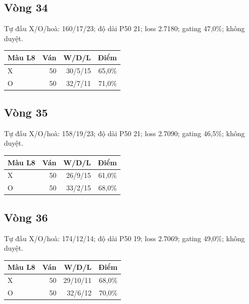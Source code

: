 \subsection*{Vòng 34}

Tự đấu X/O/hoà: 160/17/23; độ dài P50 21; loss 2.7180; gating 47,0\%; không duyệt.

\begin{center}\scriptsize\begin{tabular}{@{}lrrr@{}}\toprule

Màu L8 & Ván & W/D/L & Điểm \\

\midrule

X & 50 & 30/5/15 & 65,0\% \\

O & 50 & 32/7/11 & 71,0\% \\

\bottomrule\end{tabular}\end{center}

\subsection*{Vòng 35}

Tự đấu X/O/hoà: 158/19/23; độ dài P50 21; loss 2.7090; gating 46,5\%; không duyệt.

\begin{center}\scriptsize\begin{tabular}{@{}lrrr@{}}\toprule

Màu L8 & Ván & W/D/L & Điểm \\

\midrule

X & 50 & 26/9/15 & 61,0\% \\

O & 50 & 33/2/15 & 68,0\% \\

\bottomrule\end{tabular}\end{center}

\subsection*{Vòng 36}

Tự đấu X/O/hoà: 174/12/14; độ dài P50 19; loss 2.7069; gating 49,0\%; không duyệt.

\begin{center}\scriptsize\begin{tabular}{@{}lrrr@{}}\toprule

Màu L8 & Ván & W/D/L & Điểm \\

\midrule

X & 50 & 29/10/11 & 68,0\% \\

O & 50 & 32/6/12 & 70,0\% \\

\bottomrule\end{tabular}\end{center}

